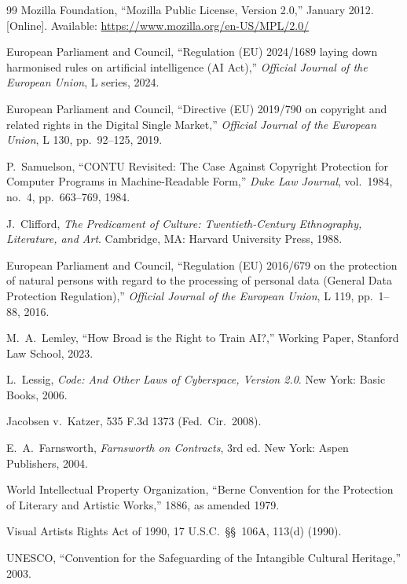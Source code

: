 \documentclass[11pt,twocolumn]{article}
\begin{document}
\begin{thebibliography}{99}
Mozilla Foundation, ``Mozilla Public License, Version 2.0,'' January
2012.
[Online]. Available: \url{https://www.mozilla.org/en-US/MPL/2.0/}

European Parliament and Council, ``Regulation (EU) 2024/1689 laying down
harmonised rules on artificial intelligence (AI Act),'' \emph{Official
Journal of the European Union}, L series, 2024.

European Parliament and Council, ``Directive (EU) 2019/790 on copyright
and related rights in the Digital Single Market,'' \emph{Official Journal
of the European Union}, L 130, pp.~92--125, 2019.

P.~Samuelson, ``CONTU Revisited: The Case Against Copyright Protection
for Computer Programs in Machine-Readable Form,'' \emph{Duke Law
Journal}, vol.~1984, no.~4, pp.~663--769, 1984.

J.~Clifford, \emph{The Predicament of Culture: Twentieth-Century
Ethnography, Literature, and Art}. Cambridge, MA: Harvard University
Press, 1988.

European Parliament and Council, ``Regulation (EU) 2016/679 on the
protection of natural persons with regard to the processing of personal
data (General Data Protection Regulation),'' \emph{Official Journal of
the European Union}, L 119, pp.~1--88, 2016.

M.~A.~Lemley, ``How Broad is the Right to Train AI?,'' Working Paper,
Stanford Law School, 2023.

L.~Lessig, \emph{Code: And Other Laws of Cyberspace, Version 2.0}. New
York: Basic Books, 2006.

Jacobsen v.\ Katzer, 535 F.3d 1373 (Fed.\ Cir.\ 2008).

E.~A.~Farnsworth, \emph{Farnsworth on Contracts}, 3rd ed. New York:
Aspen Publishers, 2004.

World Intellectual Property Organization, ``Berne Convention for the
Protection of Literary and Artistic Works,'' 1886, as amended 1979.

Visual Artists Rights Act of 1990, 17 U.S.C.\ \S\S~106A, 113(d)
(1990).

UNESCO, ``Convention for the Safeguarding of the Intangible Cultural
Heritage,'' 2003.


\end{thebibliography}
\end{document}
